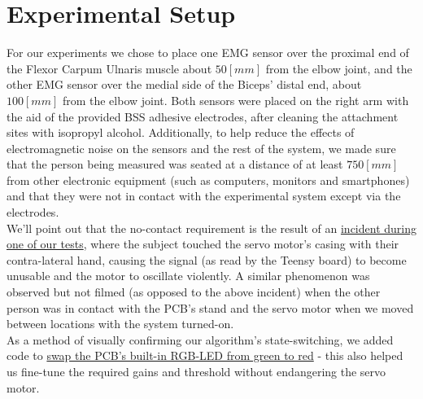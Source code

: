 \documentclass[10pt]{article}
\begin{document}
\section{Experimental Setup}
For our experiments we chose to place one EMG sensor over the proximal end of the Flexor Carpum Ulnaris muscle about $50[mm]$ from the elbow joint, and the other EMG sensor over the medial side of the Biceps' distal end, about $100[mm]$ from the elbow joint. Both sensors were placed on the right arm with the aid of the provided BSS adhesive electrodes, after cleaning the attachment sites with isopropyl alcohol. Additionally, to help reduce the effects of electromagnetic noise on the sensors and the rest of the system, we made sure that the person being measured was seated at a distance of at least $750[mm]$ from other electronic equipment (such as computers, monitors and smartphones) and that they were not in contact with the experimental system except via the electrodes.\\
We'll point out that the no-contact requirement is the result of an \href{https://technionmail-my.sharepoint.com/:v:/g/personal/eitangerber_campus_technion_ac_il/EVsCIgRIn5hEmBGYrdGdkJ8B6_X0lppvQQD-a1CJ28Dyhg?e=8qZflR}{incident during one of our tests}, where the subject touched the servo motor's casing with their contra-lateral hand, causing the signal (as read by the Teensy board) to become unusable and the motor to oscillate violently. A similar phenomenon was observed but not filmed (as opposed to the above incident) when the other person was in contact with the PCB's stand and the servo motor when we moved between locations with the system turned-on.\\
As a method of visually confirming our algorithm's state-switching, we added code to \href{https://technionmail-my.sharepoint.com/:v:/g/personal/eitangerber_campus_technion_ac_il/ET7hfGO1465PkBLXUa4EZSkBaZYCX3XrYBRLPdEY4ES-5g?e=u6yzTm}{swap the PCB's built-in RGB-LED from green to red} - this also helped us fine-tune the required gains and threshold without endangering the servo motor. 
\end{document}
